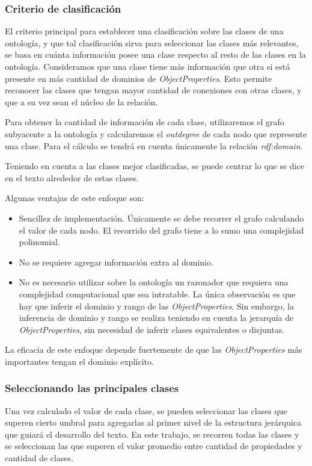 \subsubsection{Criterio de clasificación}
El criterio principal para establecer una clasificación sobre las clases de una ontología, y que tal clasificación sirva para seleccionar las clases más relevantes, se basa en cuánta información posee una clase respecto al resto de las clases en la ontología. Consideramos que una clase tiene más información que otra si está presente en más cantidad de dominios de \emph{ObjectProperties}. Esto permite reconocer las clases que tengan mayor cantidad de conexiones con otras clases, y que a su vez sean el núcleo de la relación. 

Para obtener la cantidad de información de cada clase, utilizaremos el grafo subyacente a la ontología y calcularemos el \emph{outdegree} de cada nodo que represente una clase. Para el cálculo se tendrá en cuenta únicamente la relación \emph{rdf:domain}.

Teniendo en cuenta a las clases mejor clasificadas, se puede centrar lo que se dice en el texto alrededor de estas clases.

Algunas ventajas de este enfoque son:
\begin{itemize}
    \item Sencillez de implementación. Únicamente se debe recorrer el grafo calculando el valor de cada nodo. El recorrido del grafo tiene a lo sumo una complejidad polinomial.
    \item No se requiere agregar información extra al dominio.
    \item No es necesario utilizar sobre la ontología un razonador que requiera una complejidad computacional que sea intratable. La única observación es que hay que inferir el dominio y rango de las \emph{ObjectProperties}. Sin embargo, la inferencia de dominio y rango se realiza teniendo en cuenta la jerarquía de \emph{ObjectProperties}, sin necesidad de inferir clases equivalentes o disjuntas.
\end{itemize}

La eficacia de este enfoque depende fuertemente de que las \emph{ObjectProperties} más importantes tengan el dominio explícito.


\subsubsection{Seleccionando las principales clases}
\label{sec:select_class}
Una vez calculado el valor de cada clase, se pueden seleccionar las clases que superen cierto umbral para agregarlas al primer nivel de la estructura jerárquica que guiará el desarrollo del texto. En este trabajo, se recorren todas las clases y se seleccionan las que superen el valor promedio entre cantidad de propiedades y cantidad de clases.

